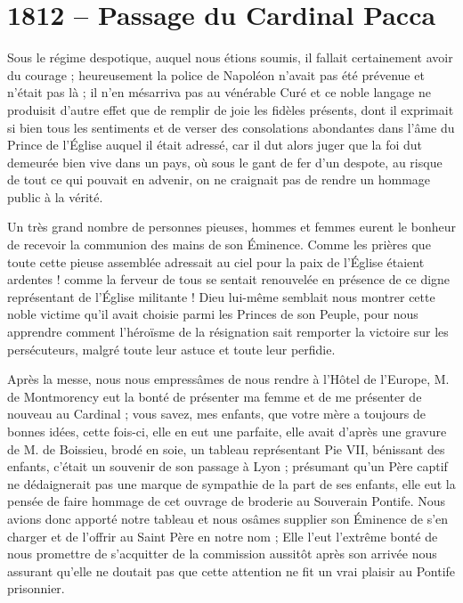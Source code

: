 \documentclass[11pt,a4paper]{report}
\begin{document}
\section*{1812 -- Passage du Cardinal Pacca}

Sous le régime despotique, auquel nous étions soumis, il fallait certainement avoir du courage ; heureusement la police de Napoléon n'avait pas été prévenue et n'était pas là ; il n'en mésarriva pas au vénérable Curé et ce noble langage ne produisit d'autre effet que de remplir de joie les fidèles présents, dont il exprimait si bien tous les sentiments et de verser des consolations abondantes dans l'âme du Prince de l'Église auquel il était adressé, car il dut alors juger que la foi dut demeurée bien vive dans un pays, où sous le gant de fer d'un despote, au risque de tout ce qui pouvait en advenir, on ne craignait pas de rendre un hommage public à la vérité.

Un très grand nombre de personnes pieuses, hommes et femmes eurent le bonheur de recevoir la communion des mains de son Éminence. Comme les prières que toute cette pieuse assemblée adressait au ciel pour la paix de l'Église étaient ardentes ! comme la ferveur de tous se sentait renouvelée en présence de ce digne représentant de l'Église militante ! Dieu lui-même semblait nous montrer cette noble victime qu'il avait choisie parmi les Princes de son Peuple, pour nous apprendre comment l'héroïsme de la résignation sait remporter la victoire sur les persécuteurs, malgré toute leur astuce et toute leur perfidie.

Après la messe, nous nous empressâmes de nous rendre à l'Hôtel de l'Europe, M. de Montmorency eut la bonté de présenter ma femme et de me présenter de nouveau au Cardinal ; vous savez, mes enfants, que votre mère a toujours de bonnes idées, cette fois-ci, elle en eut une parfaite, elle avait d'après une gravure de M. de Boissieu, brodé en soie, un tableau représentant Pie VII, bénissant des enfants, c'était un souvenir de son passage à Lyon ; présumant qu'un Père captif ne dédaignerait pas une marque de sympathie de la part de ses enfants, elle eut la pensée de faire hommage de cet ouvrage de broderie au Souverain Pontife. Nous avions donc apporté notre tableau et nous osâmes supplier son Éminence de s'en charger et de l'offrir au Saint Père en notre nom ; Elle l'eut l'extrême bonté de nous promettre de s'acquitter de la commission aussitôt après son arrivée nous assurant qu'elle ne doutait pas que cette attention ne fit un vrai plaisir au Pontife prisonnier.
\end{document}
